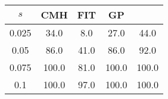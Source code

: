 \centering \begin{tabular}{c|c|c|c|c}
$s$	&CMH	&FIT	&GP	&\sc{Clear}\\\hline
0.025	&34.0	&8.0	&27.0	&44.0\\
0.05	&86.0	&41.0	&86.0	&92.0\\
0.075	&100.0	&81.0	&100.0	&100.0\\
0.1	&100.0	&97.0	&100.0	&100.0\\
\end{tabular}
